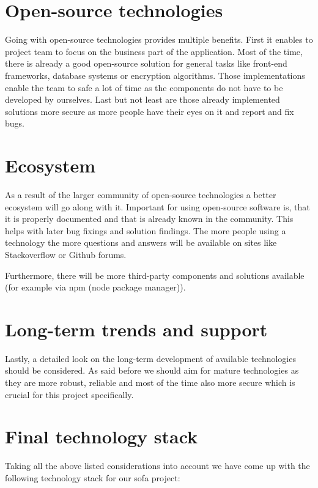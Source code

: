 \section{Open-source technologies}\label{sec:open-source-technologies}

Going with open-source technologies provides multiple benefits.
First it enables to project team to focus on the business part of the application.
Most of the time, there is already a good open-source solution for general tasks like front-end frameworks, database
systems or encryption algorithms.
Those implementations enable the team to safe a lot of time as the components do not have to be developed by ourselves.
Last but not least are those already implemented solutions more secure as more people have their eyes on it and report
and fix bugs.

\section{Ecosystem}\label{sec:ecosystem}

As a result of the larger community of open-source technologies a better ecosystem will go along with it.
Important for using open-source software is, that it is properly documented and that is already known in the community.
This helps with later bug fixings and solution findings.
The more people using a technology the more questions and answers will be available on sites like Stackoverflow or
Github forums.

Furthermore, there will be more third-party components and solutions available
(for example via npm (node package manager)).

\section{Long-term trends and support}\label{sec:long-term-trends-and-support}

Lastly, a detailed look on the long-term development of available technologies should be considered.
As said before we should aim for mature technologies as they are more robust, reliable and most of the time also more
secure which is crucial for this project specifically.

\section{Final technology stack}\label{sec:final-technology-stack}

Taking all the above listed considerations into account we have come up with the following technology stack for our
\ac{sofa} project:

